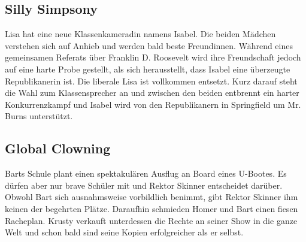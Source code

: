 \subsection{Silly Simpsony}\label{SABF02}
Lisa hat eine neue Klassenkameradin namens Isabel. Die beiden Mädchen verstehen sich auf Anhieb und werden bald beste Freundinnen. Während eines gemeinsamen Referats über Franklin D. Roosevelt wird ihre Freundschaft jedoch auf eine harte Probe gestellt, als sich herausstellt, dass Isabel eine überzeugte Republikanerin ist. Die liberale Lisa ist vollkommen entsetzt. Kurz darauf steht die Wahl zum Klassensprecher an und zwischen den beiden entbrennt ein harter Konkurrenzkampf und Isabel wird von den Republikanern in Springfield um Mr. Burns unterstützt.


\subsection{Global Clowning}\label{SABF04}
Barts Schule plant einen spektakulären Ausflug an Board eines U-Bootes. Es dürfen aber nur brave Schüler mit und Rektor Skinner entscheidet darüber. Obwohl Bart sich ausnahmsweise vorbildlich benimmt, gibt Rektor Skinner ihm keinen der begehrten Plätze. Daraufhin schmieden Homer und Bart einen fiesen Racheplan. Krusty verkauft unterdessen die Rechte an seiner Show in die ganze Welt und schon bald sind seine Kopien erfolgreicher als er selbst.


